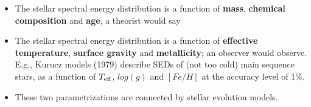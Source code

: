 \documentclass[letterpaper,landscape]{slides}
\begin{document}
\begin{slide}
{\begin{minipage}[t]{12cm}
\begin{itemize}
\item {\color{blue} The stellar spectral energy distribution} is a function of 
      {\bf mass}, {\bf chemical composition} and {\bf age}, a theorist would say
\item {\color{blue} The stellar spectral energy distribution} is a function of 
      {\bf effective temperature}, {\bf surface gravity} and {\bf metallicity}; an observer would observe. E.g., {\color{blue} Kurucz models (1979)} 
      describe SEDs of (not too cold) main sequence stars, as a function of $T_{\rm eff}$, 
      $log(g)$ and $[Fe/H]$ at the accuracy level of 1\%.
\item These two parametrizations are connected by {\color{blue} stellar evolution models.}
\end{itemize}

\end{minipage}}
\vfill 
\end{slide}
\end{document}
